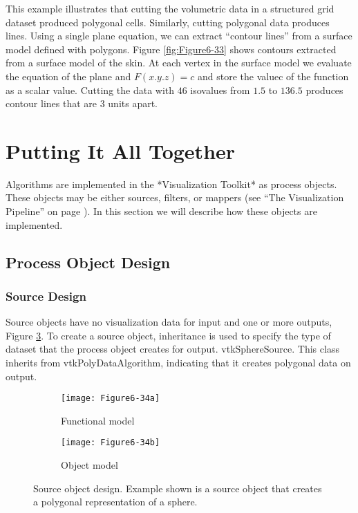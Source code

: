 This example illustrates that cutting the volumetric data in a structured grid dataset produced polygonal cells. Similarly, cutting polygonal data produces lines. Using a single plane equation, we can extract ``contour lines'' from a surface model defined with polygons. Figure \ref{fig:Figure6-33} shows contours extracted from a surface model of the skin. At each vertex in the surface model we evaluate the equation of the plane and $F(x.y.z) = c$ and store the valuec of the function as a scalar value. Cutting the data with $46$ isovalues from $1.5$ to $136.5$ produces contour lines that are $3$ units apart.

\section{Putting It All Together}

Algorithms are implemented in the *Visualization Toolkit* as process objects. These objects may be either sources, filters, or mappers (see ``The Visualization Pipeline'' on page \pageref{sec:visualization_pipeline} ). In this section we will describe how these objects are implemented.

\subsection{Process Object Design}

\subsubsection{Source Design}
Source objects have no visualization data for input and one or more outputs, Figure \ref{fig:Figure6-34}. To create a source object, inheritance is used to specify the type of dataset that the process object creates for output. vtkSphereSource. This class inherits from vtkPolyDataAlgorithm, indicating that it creates polygonal data on output.

\begin{figure}[htb]
	\begin{subfigure}[h]{0.48\linewidth}
		\texttt{[image: Figure6-34a]}
		\caption{Functional model}
		\label{fig:Figure6-34a}
	\end{subfigure}
	\hfill
	\begin{subfigure}[h]{0.48\linewidth}
		\texttt{[image: Figure6-34b]}
		\caption{Object model}
		\label{fig:Figure6-34b}
	\end{subfigure}
	\caption{Source object design. Example shown is a source object that creates a polygonal representation of a sphere.}\label{fig:Figure6-34}
\end{figure}

